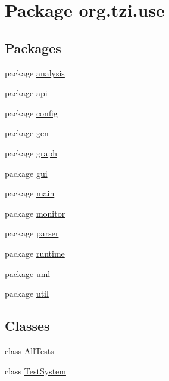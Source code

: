 \hypertarget{namespaceorg_1_1tzi_1_1use}{\section{Package org.\-tzi.\-use}
\label{namespaceorg_1_1tzi_1_1use}
}
\subsection*{Packages}
\begin{DoxyCompactItemize}
\item 
package \hyperlink{namespaceorg_1_1tzi_1_1use_1_1analysis}{analysis}
\item 
package \hyperlink{namespaceorg_1_1tzi_1_1use_1_1api}{api}
\item 
package \hyperlink{namespaceorg_1_1tzi_1_1use_1_1config}{config}
\item 
package \hyperlink{namespaceorg_1_1tzi_1_1use_1_1gen}{gen}
\item 
package \hyperlink{namespaceorg_1_1tzi_1_1use_1_1graph}{graph}
\item 
package \hyperlink{namespaceorg_1_1tzi_1_1use_1_1gui}{gui}
\item 
package \hyperlink{namespaceorg_1_1tzi_1_1use_1_1main}{main}
\item 
package \hyperlink{namespaceorg_1_1tzi_1_1use_1_1monitor}{monitor}
\item 
package \hyperlink{namespaceorg_1_1tzi_1_1use_1_1parser}{parser}
\item 
package \hyperlink{namespaceorg_1_1tzi_1_1use_1_1runtime}{runtime}
\item 
package \hyperlink{namespaceorg_1_1tzi_1_1use_1_1uml}{uml}
\item 
package \hyperlink{namespaceorg_1_1tzi_1_1use_1_1util}{util}
\end{DoxyCompactItemize}
\subsection*{Classes}
\begin{DoxyCompactItemize}
\item 
class \hyperlink{classorg_1_1tzi_1_1use_1_1_all_tests}{All\-Tests}
\item 
class \hyperlink{classorg_1_1tzi_1_1use_1_1_test_system}{Test\-System}
\end{DoxyCompactItemize}
